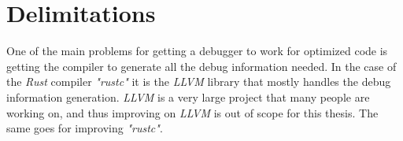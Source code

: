 






\section{Delimitations}





One of the main problems for getting a debugger to work for optimized code is getting the compiler to generate all the debug information needed.
In the case of the \emph{Rust} compiler \emph{"rustc"}  it is the \emph{LLVM} library that mostly handles the debug information generation.
\emph{LLVM} is a very large project that many people are working on, and thus improving on \emph{LLVM} is out of scope for this thesis.
The same goes for improving \emph{"rustc"}.


